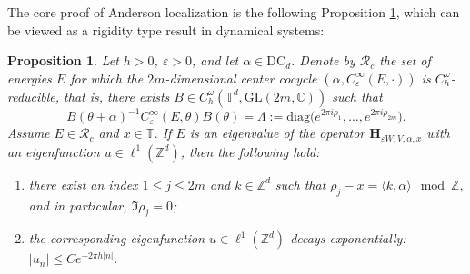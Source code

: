 \documentclass[reqno,11pt]{amsart}
\newtheorem{proposition}{Proposition}[section]
\def\diag{{\mathrm{diag}}}
\begin{document}
The core proof of Anderson localization  is the following Proposition \ref{prop:rigidity}, which can be viewed as a rigidity type
result in dynamical systems:

\begin{proposition}\label{prop:rigidity}
Let $h>0$, $\varepsilon>0$, and let $\alpha \in \mathrm{DC}_d$. Denote by $\mathcal{R}_c$ the set of energies $E$ for which the $2m$-dimensional center cocycle $(\alpha, C_\varepsilon^\infty(E, \cdot))$ is $C_h^\omega$-reducible, that is, there exists $B \in C_h^\omega(\mathbb{T}^d, \mathrm{GL}(2m, \mathbb{C}))$ such that
\begin{equation*}\label{eq:icc-reducibility}
B(\theta+\alpha)^{-1} C_\varepsilon^\infty(E, \theta) B(\theta) = \Lambda := 
\diag\bigl(e^{2\pi i\rho_1},\dots,e^{2\pi i\rho_{2m}}\bigr).
\end{equation*}
Assume $E \in \mathcal{R}_c$ and $x \in \mathbb{T}$. If $E$ is an eigenvalue of the operator $\mathbf{H}_{\varepsilon W,V,\alpha,x}$ with an eigenfunction $u \in \ell^1(\mathbb{Z}^d)$, then the following hold:
\begin{enumerate}
    \item there exist an index $1 \le j \le 2m$ and $k \in \mathbb{Z}^d$ such that 
    $\rho_j - x = \langle k, \alpha \rangle \mod \mathbb{Z},$
    and in particular, $\Im \rho_j = 0$;
    \item the corresponding eigenfunction $u \in \ell^1(\mathbb{Z}^d)$ decays exponentially: $|u_n|\le C  e^{-2\pi h|n|}.$

\end{enumerate}
\end{proposition}
\end{document}
